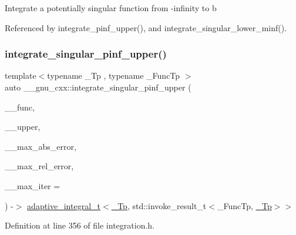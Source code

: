 Integrate a potentially singular function from -\/infinity to b 

Referenced by integrate\+\_\+pinf\+\_\+upper(), and integrate\+\_\+singular\+\_\+lower\+\_\+minf().

\mbox{\label{namespace____gnu__cxx_aa9f2cb4d805bca6241e46ab08437c25d}} 
\subsubsection{\texorpdfstring{integrate\+\_\+singular\+\_\+pinf\+\_\+upper()}{integrate\_singular\_pinf\_upper()}}
{\footnotesize\ttfamily template$<$typename \+\_\+\+Tp , typename \+\_\+\+Func\+Tp $>$ \\
auto \+\_\+\+\_\+gnu\+\_\+cxx\+::integrate\+\_\+singular\+\_\+pinf\+\_\+upper (\begin{DoxyParamCaption}\item[{\+\_\+\+Func\+Tp}]{\+\_\+\+\_\+func,  }\item[{\hyperlink{namespace____gnu__cxx_a3b19a9c800ca194374ef9172290f7d79}{\+\_\+\+Tp}}]{\+\_\+\+\_\+upper,  }\item[{\hyperlink{namespace____gnu__cxx_a3b19a9c800ca194374ef9172290f7d79}{\+\_\+\+Tp}}]{\+\_\+\+\_\+max\+\_\+abs\+\_\+error,  }\item[{\hyperlink{namespace____gnu__cxx_a3b19a9c800ca194374ef9172290f7d79}{\+\_\+\+Tp}}]{\+\_\+\+\_\+max\+\_\+rel\+\_\+error,  }\item[{std\+::size\+\_\+t}]{\+\_\+\+\_\+max\+\_\+iter = {} }\end{DoxyParamCaption}) -\/$>$ \hyperlink{struct____gnu__cxx_1_1adaptive__integral__t}{adaptive\+\_\+integral\+\_\+t}$<$\hyperlink{namespace____gnu__cxx_a3b19a9c800ca194374ef9172290f7d79}{\+\_\+\+Tp}, std\+::invoke\+\_\+result\+\_\+t$<$\+\_\+\+Func\+Tp, \hyperlink{namespace____gnu__cxx_a3b19a9c800ca194374ef9172290f7d79}{\+\_\+\+Tp}$>$$>$
    \hspace{0.3cm}{\ttfamily [inline]}}



Definition at line 356 of file integration.\+h.




